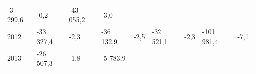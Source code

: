 \begin{longtable}[]{@{}lllllllll@{}}
\begin{minipage}[t]{0.12\columnwidth}
-3 299,6\strut
\end{minipage} & \begin{minipage}[t]{0.06\columnwidth}\raggedright
-0,2\strut
\end{minipage} & \begin{minipage}[t]{0.09\columnwidth}\raggedright
-43 055,2\strut
\end{minipage} & \begin{minipage}[t]{0.06\columnwidth}\raggedright
-3,0\strut
\end{minipage}\tabularnewline
\begin{minipage}[t]{0.05\columnwidth}\raggedright
2012\strut
\end{minipage} & \begin{minipage}[t]{0.10\columnwidth}\raggedright
-33 327,4\strut
\end{minipage} & \begin{minipage}[t]{0.06\columnwidth}\raggedright
-2,3\strut
\end{minipage} & \begin{minipage}[t]{0.16\columnwidth}\raggedright
-36 132,9\strut
\end{minipage} & \begin{minipage}[t]{0.06\columnwidth}\raggedright
-2,5\strut
\end{minipage} & \begin{minipage}[t]{0.12\columnwidth}\raggedright
-32 521,1\strut
\end{minipage} & \begin{minipage}[t]{0.06\columnwidth}\raggedright
-2,3\strut
\end{minipage} & \begin{minipage}[t]{0.09\columnwidth}\raggedright
-101 981,4\strut
\end{minipage} & \begin{minipage}[t]{0.06\columnwidth}\raggedright
-7,1\strut
\end{minipage}\tabularnewline
\begin{minipage}[t]{0.05\columnwidth}\raggedright
2013\strut
\end{minipage} & \begin{minipage}[t]{0.10\columnwidth}\raggedright
-26 507,3\strut
\end{minipage} & \begin{minipage}[t]{0.06\columnwidth}\raggedright
-1,8\strut
\end{minipage} & \begin{minipage}[t]{0.16\columnwidth}\raggedright
-5 783,9\strut

\end{minipage}
\end{longtable}
